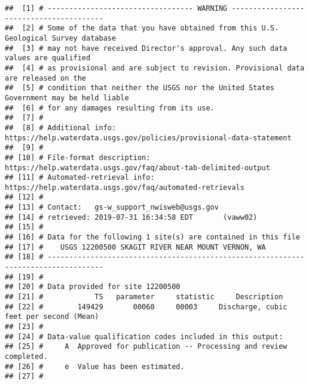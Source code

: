 \documentclass[11pt,]{article}
\begin{document}
\begin{verbatim}
##  [1] # ---------------------------------- WARNING ----------------------------------------     
##  [2] # Some of the data that you have obtained from this U.S. Geological Survey database       
##  [3] # may not have received Director's approval. Any such data values are qualified           
##  [4] # as provisional and are subject to revision. Provisional data are released on the        
##  [5] # condition that neither the USGS nor the United States Government may be held liable     
##  [6] # for any damages resulting from its use.                                                 
##  [7] #                                                                                         
##  [8] # Additional info: https://help.waterdata.usgs.gov/policies/provisional-data-statement    
##  [9] #                                                                                         
## [10] # File-format description:  https://help.waterdata.usgs.gov/faq/about-tab-delimited-output
## [11] # Automated-retrieval info: https://help.waterdata.usgs.gov/faq/automated-retrievals      
## [12] #                                                                                         
## [13] # Contact:   gs-w_support_nwisweb@usgs.gov                                                
## [14] # retrieved: 2019-07-31 16:34:58 EDT       (vaww02)                                       
## [15] #                                                                                         
## [16] # Data for the following 1 site(s) are contained in this file                             
## [17] #    USGS 12200500 SKAGIT RIVER NEAR MOUNT VERNON, WA                                     
## [18] # -----------------------------------------------------------------------------------     
## [19] #                                                                                         
## [20] # Data provided for site 12200500                                                         
## [21] #            TS   parameter     statistic     Description                                 
## [22] #        149429       00060     00003     Discharge, cubic feet per second (Mean)         
## [23] #                                                                                         
## [24] # Data-value qualification codes included in this output:                                 
## [25] #     A  Approved for publication -- Processing and review completed.                     
## [26] #     e  Value has been estimated.                                                        
## [27] #
\end{verbatim}
\end{document}
